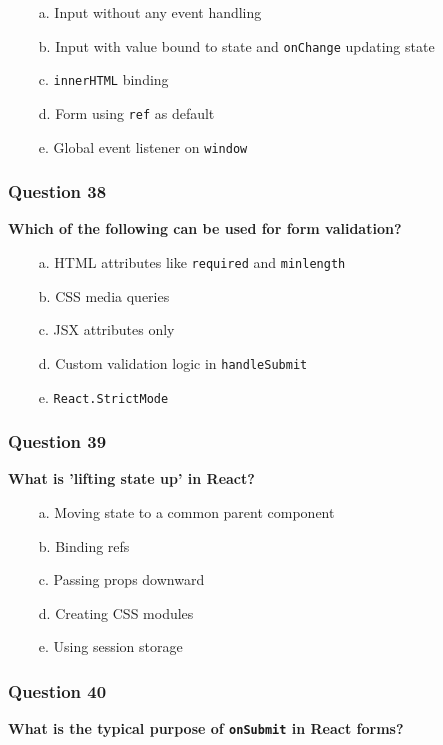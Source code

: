 \documentclass{article}
\newcommand{\cmark}{\textcolor{green}{\ding{51}}} %
\newcommand{\xmark}{\textcolor{red}{\ding{55}}}   %
\begin{document}
\begin{itemize}
  \item[\xmark\ a.] Input without any event handling
  \item[\cmark\ b.] Input with value bound to state and \texttt{onChange} updating state
  \item[\xmark\ c.] \texttt{innerHTML} binding
  \item[\xmark\ d.] Form using \texttt{ref} as default
  \item[\xmark\ e.] Global event listener on \texttt{window}
\end{itemize}

\subsubsection*{Question 38}
\textbf{Which of the following can be used for form validation?}

\begin{itemize}
  \item[\cmark\ a.] HTML attributes like \texttt{required} and \texttt{minlength}
  \item[\xmark\ b.] CSS media queries
  \item[\xmark\ c.] JSX attributes only
  \item[\cmark\ d.] Custom validation logic in \texttt{handleSubmit}
  \item[\xmark\ e.] \texttt{React.StrictMode}
\end{itemize}

\subsubsection*{Question 39}
\textbf{What is 'lifting state up' in React?}

\begin{itemize}
  \item[\cmark\ a.] Moving state to a common parent component
  \item[\xmark\ b.] Binding refs
  \item[\xmark\ c.] Passing props downward
  \item[\xmark\ d.] Creating CSS modules
  \item[\xmark\ e.] Using session storage
\end{itemize}

\subsubsection*{Question 40}
\textbf{What is the typical purpose of \texttt{onSubmit} in React forms?}
\end{document}
